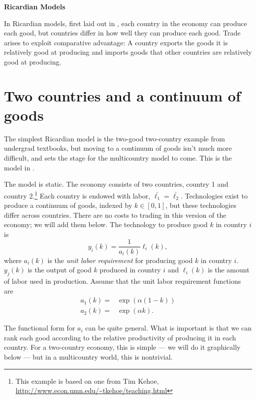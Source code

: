 \documentclass[11pt, pdftex]{article}
\newcommand{\ph}{\phantom}
\begin{document}
\ph{whatever}
\medskip

\centerline{\bf \Large Ricardian Models}


In Ricardian models, first laid out in \citet{ricardo}, each country in the economy can produce each good, but countries differ in how well they can produce each good.  Trade arises to exploit comparative advantage: A country exports the goods it is relatively good at producing and imports goods that other countries are relatively good at producing.

\section{Two countries and a continuum of goods}
The simplest Ricardian model is the two-good two-country example from undergrad textbooks, but moving to a continuum of goods isn't much more difficult, and sets the stage for the multicountry model to come.  This is the model in \citet{dornbusch}.

The model is static. The economy consists of two countries, country 1 and country 2.\footnote{This example is based on one from Tim Kehoe, \url{http://www.econ.umn.edu/~tkehoe/teaching.html}} Each country is endowed with labor, $\bar{\ell_1} =\bar{ \ell_2}$.  Technologies exist to produce a continuum of goods, indexed by $k \in [0,1]$, but these technologies differ across countries. There are no costs to trading in this version of the economy;  we will add them below.  The technology to produce good $k$ in country $i$ is
\begin{equation}
  y_i(k) = \frac{1}{a_i(k)} \ell_i(k),
\end{equation}
where $a_i(k)$ is the \textit{unit labor requirement} for producing good $k$ in country $i$. $y_j(k)$ is the output of good $k$ produced in country $i$ and $\ell_i(k)$ is the amount of labor used in production. Assume that the unit labor requirement functions are
\begin{align}
  a_1(k) = & \exp\left(\alpha \left(1-k\right)\right)\\
  a_2(k) = & \exp\left(\alpha k\right).
\end{align}

The functional form for $a_i$ can be quite general.  What is important is that we can rank each good according to the relative productivity of producing it in each country.  For a two-country economy, this is simple --- we will do it graphically below --- but in a multicountry world, this is nontrivial.
\end{document}
